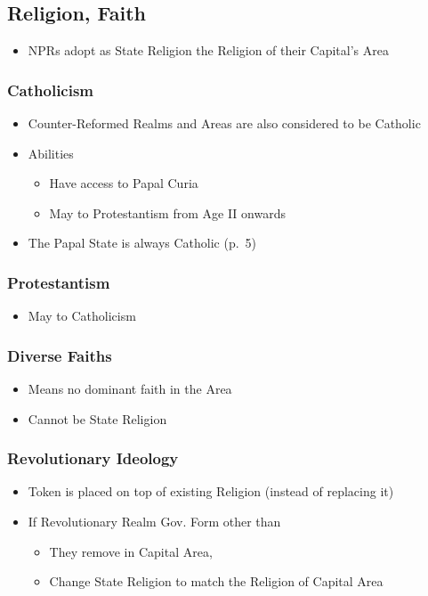 \documentclass[10pt]{article}
\begin{document}
\subsection*{Religion, Faith }
\begin{itemize}
	\item NPRs adopt as State Religion the Religion of their Capital's Area
\end{itemize}

\subsubsection*{Catholicism}
\begin{itemize}
	\item Counter-Reformed Realms and Areas are also considered to be Catholic
	\item Abilities
	\begin{itemize}
		\item Have access to Papal Curia
		\item May  to Protestantism from Age II onwards
	\end{itemize}
	\item The Papal State is always Catholic (p.~5)
\end{itemize}

\subsubsection*{Protestantism}
\begin{itemize}
	\item May  to Catholicism
\end{itemize}

\subsubsection*{Diverse Faiths}
\begin{itemize}
	\item Means no dominant faith in the Area
	\item Cannot be State Religion
\end{itemize}

\subsubsection*{Revolutionary Ideology}
\begin{itemize}
	\item Token is placed on top of existing Religion (instead of replacing it)
	\item If Revolutionary Realm  Gov. Form other than 
	\begin{itemize}
		\item They remove \revolution in Capital Area, 
		\item Change State Religion to match the Religion of Capital Area
	\end{itemize}
\end{itemize}
\end{document}

